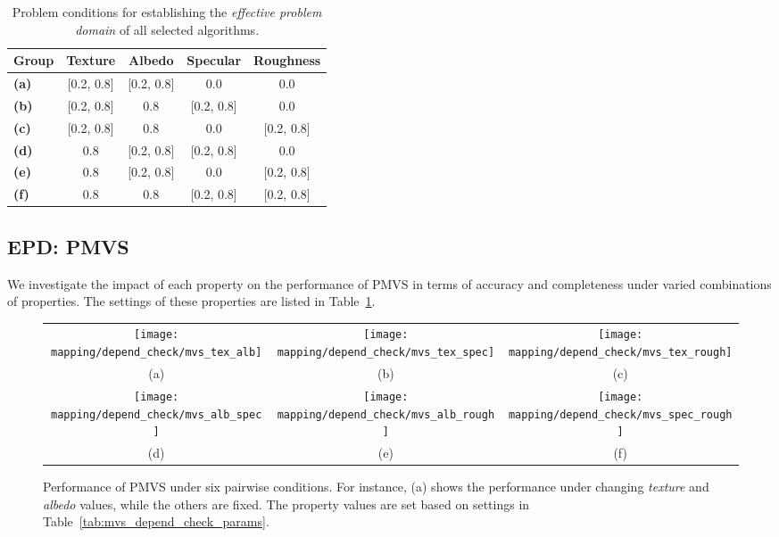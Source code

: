 \begin{table}[!htbp]
  \centering
  \begin{tabular}{l*{4}{c}}
  \hline
  \textbf{Group} & Texture & Albedo & Specular & Roughness\\
  \hline
  \textbf{(a)} & [0.2, 0.8] & [0.2, 0.8] & 0.0 & 0.0\\
  \textbf{(b)} & [0.2, 0.8] & 0.8 & [0.2, 0.8] & 0.0\\
  \textbf{(c)} & [0.2, 0.8] & 0.8 & 0.0 & [0.2, 0.8]\\
  \textbf{(d)} & 0.8 & [0.2, 0.8] & [0.2, 0.8] & 0.0\\
  \textbf{(e)} & 0.8 & [0.2, 0.8] & 0.0 & [0.2, 0.8]\\
  \textbf{(f)} & 0.8 & 0.8 & [0.2, 0.8] & [0.2, 0.8]\\
  \hline
  \end{tabular}
  \caption{Problem conditions for establishing the \textit{effective problem domain} of all selected algorithms.}
  \label{tab:pairwise_prob_cond}
\end{table}

\subsection{EPD: PMVS}
\label{sec:mvs_epd}
We investigate the impact of each property on the performance of PMVS in terms of accuracy and completeness under varied combinations of properties. The settings of these properties are listed in Table~\ref{tab:pairwise_prob_cond}.

\begin{figure}
\begin{tabular}{ccc}
\texttt{[image: mapping/depend\_check/mvs\_tex\_alb]}&
\texttt{[image: mapping/depend\_check/mvs\_tex\_spec]}&
\texttt{[image: mapping/depend\_check/mvs\_tex\_rough]}\\
(a) & (b) & (c)\\
\texttt{[image: mapping/depend\_check/mvs\_alb\_spec]}&
\texttt{[image: mapping/depend\_check/mvs\_alb\_rough]}&
\texttt{[image: mapping/depend\_check/mvs\_spec\_rough]}\\
(d) & (e) & (f)\\
\end{tabular}
\caption{Performance of PMVS under six pairwise conditions. For instance, (a) shows the performance under changing \textit{texture} and \textit{albedo} values, while the others are fixed. The property values are set based on settings in Table~\ref{tab:mvs_depend_check_params}.}
\label{fig:mvs_depend_check}
\end{figure}

